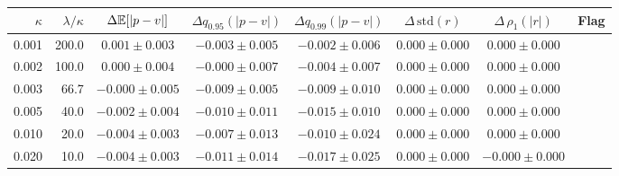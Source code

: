 \begin{tabular}{rrcccccc}
\hline
$\kappa$ & $\lambda/\kappa$ & $\Delta\mathbb{E}[|p-v|]$ & $\Delta q_{0.95}(|p-v|)$ & $\Delta q_{0.99}(|p-v|)$ & $\Delta\,\mathrm{std}(r)$ & $\Delta\,\rho_1(|r|)$ & Flag \\
\hline
0.001 & 200.0 & $0.001\pm0.003$ & $-0.003\pm0.005$ & $-0.002\pm0.006$ & $0.000\pm0.000$ & $0.000\pm0.000$ &  \\
0.002 & 100.0 & $0.000\pm0.004$ & $-0.000\pm0.007$ & $-0.004\pm0.007$ & $0.000\pm0.000$ & $0.000\pm0.000$ &  \\
0.003 & 66.7 & $-0.000\pm0.005$ & $-0.009\pm0.005$ & $-0.009\pm0.010$ & $0.000\pm0.000$ & $0.000\pm0.000$ &  \\
0.005 & 40.0 & $-0.002\pm0.004$ & $-0.010\pm0.011$ & $-0.015\pm0.010$ & $0.000\pm0.000$ & $0.000\pm0.000$ &  \\
0.010 & 20.0 & $-0.004\pm0.003$ & $-0.007\pm0.013$ & $-0.010\pm0.024$ & $0.000\pm0.000$ & $0.000\pm0.000$ &  \\
0.020 & 10.0 & $-0.004\pm0.003$ & $-0.011\pm0.014$ & $-0.017\pm0.025$ & $0.000\pm0.000$ & $-0.000\pm0.000$ &  \\
\hline
\end{tabular}
